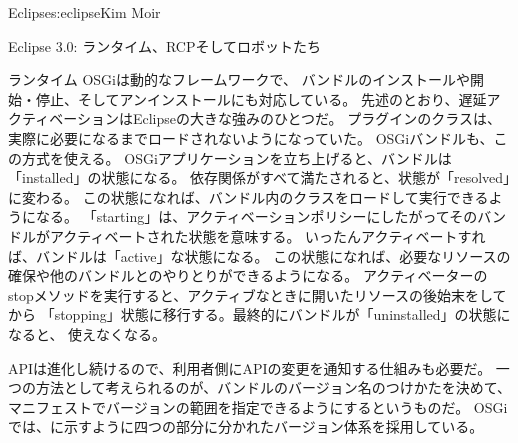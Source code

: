 \begin{aosachapter}{Eclipse}{s:eclipse}{Kim Moir}
\begin{aosasect1}{Eclipse 3.0: ランタイム、RCPそしてロボットたち}
\begin{aosasect2}{ランタイム}
OSGiは動的なフレームワークで、
バンドルのインストールや開始・停止、そしてアンインストールにも対応している。
先述のとおり、遅延アクティベーションはEclipseの大きな強みのひとつだ。
プラグインのクラスは、実際に必要になるまでロードされないようになっていた。
OSGiバンドルも、この方式を使える。
OSGiアプリケーションを立ち上げると、バンドルは「installed」の状態になる。
依存関係がすべて満たされると、状態が「resolved」に変わる。
この状態になれば、バンドル内のクラスをロードして実行できるようになる。
「starting」は、アクティベーションポリシーにしたがってそのバンドルがアクティベートされた状態を意味する。
いったんアクティベートすれば、バンドルは「active」な状態になる。
この状態になれば、必要なリソースの確保や他のバンドルとのやりとりができるようになる。
アクティベーターのstopメソッドを実行すると、アクティブなときに開いたリソースの後始末をしてから
「stopping」状態に移行する。最終的にバンドルが「uninstalled」の状態になると、
使えなくなる。

APIは進化し続けるので、利用者側にAPIの変更を通知する仕組みも必要だ。
一つの方法として考えられるのが、バンドルのバージョン名のつけかたを決めて、
マニフェストでバージョンの範囲を指定できるようにするというものだ。
OSGiでは、に示すように四つの部分に分かれたバージョン体系を採用している。


\end{aosasect2}
\end{aosasect1}
\end{aosachapter}
